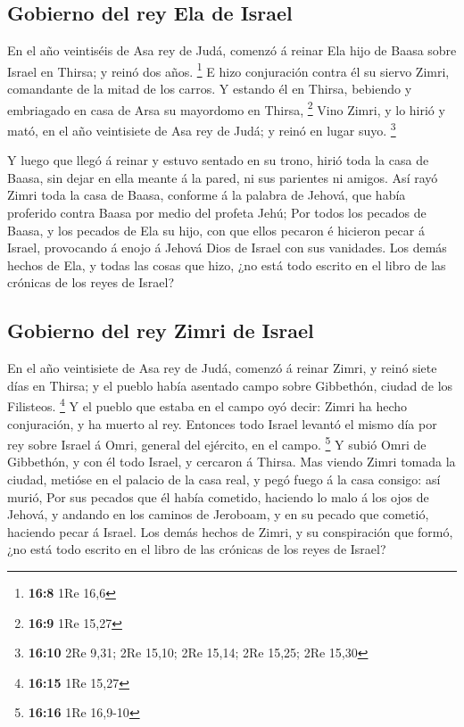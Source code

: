 \hypertarget{gobierno-del-rey-ela-de-israel}{%
\subsection{Gobierno del rey Ela de
Israel}\label{gobierno-del-rey-ela-de-israel}}

 En el año veintiséis de Asa rey de Judá, comenzó á reinar
Ela hijo de Baasa sobre Israel en Thirsa; y reinó dos años. \footnote{\textbf{16:8}
  1Re 16,6}  E hizo conjuración contra él su siervo Zimri,
comandante de la mitad de los carros. Y estando él en Thirsa, bebiendo y
embriagado en casa de Arsa su mayordomo en Thirsa, \footnote{\textbf{16:9}
  1Re 15,27}  Vino Zimri, y lo hirió y mató, en el año
veintisiete de Asa rey de Judá; y reinó en lugar suyo. \footnote{\textbf{16:10}
  2Re 9,31; 2Re 15,10; 2Re 15,14; 2Re 15,25; 2Re 15,30}

 Y luego que llegó á reinar y estuvo sentado en su trono,
hirió toda la casa de Baasa, sin dejar en ella meante á la pared, ni sus
parientes ni amigos.  Así rayó Zimri toda la casa de Baasa,
conforme á la palabra de Jehová, que había proferido contra Baasa por
medio del profeta Jehú;  Por todos los pecados de Baasa, y
los pecados de Ela su hijo, con que ellos pecaron é hicieron pecar á
Israel, provocando á enojo á Jehová Dios de Israel con sus vanidades.
 Los demás hechos de Ela, y todas las cosas que hizo, ¿no
está todo escrito en el libro de las crónicas de los reyes de Israel?

\hypertarget{gobierno-del-rey-zimri-de-israel}{%
\subsection{Gobierno del rey Zimri de
Israel}\label{gobierno-del-rey-zimri-de-israel}}

 En el año veintisiete de Asa rey de Judá, comenzó á reinar
Zimri, y reinó siete días en Thirsa; y el pueblo había asentado campo
sobre Gibbethón, ciudad de los Filisteos. \footnote{\textbf{16:15} 1Re
  15,27}  Y el pueblo que estaba en el campo oyó decir:
Zimri ha hecho conjuración, y ha muerto al rey. Entonces todo Israel
levantó el mismo día por rey sobre Israel á Omri, general del ejército,
en el campo. \footnote{\textbf{16:16} 1Re 16,9-10}  Y subió
Omri de Gibbethón, y con él todo Israel, y cercaron á Thirsa.
 Mas viendo Zimri tomada la ciudad, metióse en el palacio
de la casa real, y pegó fuego á la casa consigo: así murió,
 Por sus pecados que él había cometido, haciendo lo malo á
los ojos de Jehová, y andando en los caminos de Jeroboam, y en su pecado
que cometió, haciendo pecar á Israel.  Los demás hechos de
Zimri, y su conspiración que formó, ¿no está todo escrito en el libro de
las crónicas de los reyes de Israel?

